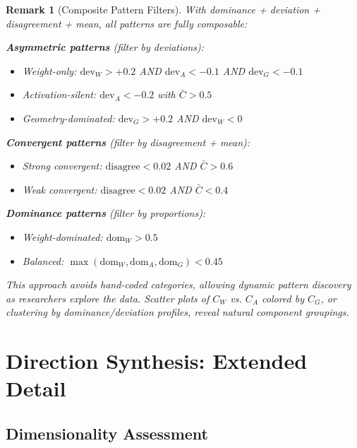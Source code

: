\documentclass[11pt]{article}
\newtheorem{remark}{Remark}[section]
\begin{document}
\begin{remark}[Composite Pattern Filters]
\label{rem:composite-pattern-filters}
With dominance + deviation + disagreement + mean, all patterns are fully composable:

\textbf{Asymmetric patterns} (filter by deviations):
\begin{itemize}[nosep]
\item Weight-only: $\text{dev}_W > +0.2$ AND $\text{dev}_A < -0.1$ AND $\text{dev}_G < -0.1$
\item Activation-silent: $\text{dev}_A < -0.2$ with $\bar{C} > 0.5$
\item Geometry-dominated: $\text{dev}_G > +0.2$ AND $\text{dev}_W < 0$
\end{itemize}

\textbf{Convergent patterns} (filter by disagreement + mean):
\begin{itemize}[nosep]
\item Strong convergent: $\text{disagree} < 0.02$ AND $\bar{C} > 0.6$
\item Weak convergent: $\text{disagree} < 0.02$ AND $\bar{C} < 0.4$
\end{itemize}

\textbf{Dominance patterns} (filter by proportions):
\begin{itemize}[nosep]
\item Weight-dominated: $\text{dom}_W > 0.5$
\item Balanced: $\max(\text{dom}_W, \text{dom}_A, \text{dom}_G) < 0.45$
\end{itemize}

This approach avoids hand-coded categories, allowing dynamic pattern discovery as researchers explore the data. Scatter plots of $C_W$ vs. $C_A$ colored by $C_G$, or clustering by dominance/deviation profiles, reveal natural component groupings.
\end{remark}

\section{Direction Synthesis: Extended Detail}
\label{app:direction-synthesis-detail}

\subsection{Dimensionality Assessment}
\end{document}
